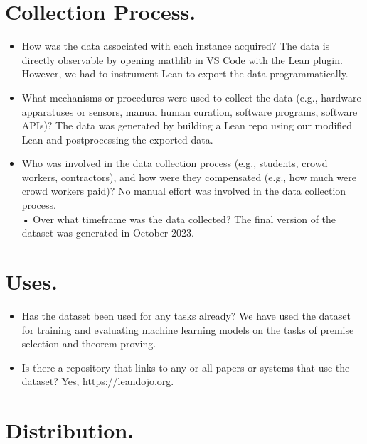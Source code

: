 \documentclass[
]{article}
\providecommand{\tightlist}{%
  \setlength{\itemsep}{0pt}\setlength{\parskip}{0pt}}
\begin{document}
\section{Collection Process.}\label{collection-process.}

\begin{itemize}
\item
  How was the data associated with each instance acquired? The data is
  directly observable by opening mathlib in VS Code with the Lean
  plugin. However, we had to instrument Lean to export the data
  programmatically.\\
\item
  What mechanisms or procedures were used to collect the data (e.g.,
  hardware apparatuses or sensors, manual human curation, software
  programs, software APIs)? The data was generated by building a Lean
  repo using our modified Lean and postprocessing the exported data.
\item
  Who was involved in the data collection process (e.g., students, crowd
  workers, contractors), and how were they compensated (e.g., how much
  were crowd workers paid)? No manual effort was involved in the data
  collection process.\\
  • Over what timeframe was the data collected? The final version of the
  dataset was generated in October 2023.
\end{itemize}

\section{Uses.}\label{uses.}

\begin{itemize}
\tightlist
\item
  Has the dataset been used for any tasks already? We have used the
  dataset for training and evaluating machine learning models on the
  tasks of premise selection and theorem proving.\\
\item
  Is there a repository that links to any or all papers or systems that
  use the dataset? Yes, https://leandojo.org.
\end{itemize}

\section{Distribution.}\label{distribution.}
\end{document}
